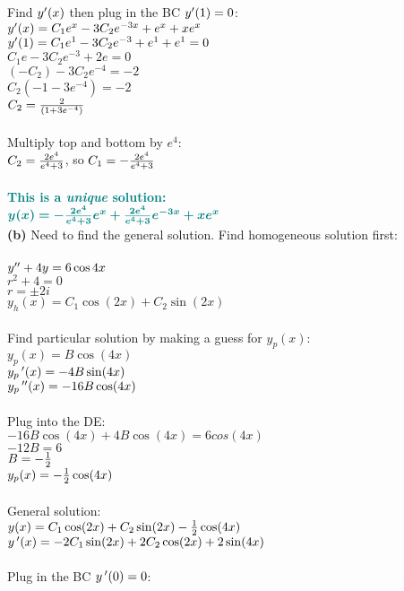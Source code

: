 \documentclass{article}
\begin{document}
\begin{enumerate}
Find $y\sp\prime(x)$ then plug in the BC $y\sp\prime(1)=0$:\\
$y\sp\prime(x) = C_1e^{x} - 3C_2e^{-3x} + e^x + xe^x$\\
$y\sp\prime(1) = C_1e^{1} - 3C_2e^{-3} + e^1 + e^1 = 0$\\
$C_1e - 3C_2e^{-3} + 2e = 0$\\
$(-C_2) - 3C_2e^{-4} = -2$\\
$C_2(-1 - 3e^{-4}) = -2$\\
$C_2 = {2 \over (1 + 3e^{-4})}$\\\\
Multiply top and bottom by $e^4$:\\
$C_2 = {2e^4 \over e^4 + 3}$, so $C_1 = -{2e^4 \over e^4 + 3}$\\\\
\textcolor{teal}{\textbf{This is a \emph{unique} solution:}}\\
$\textcolor{teal}{\bm{y(x) = -{2e^4 \over e^4 + 3}e^{x} + {2e^4 \over e^4 + 3}e^{-3x} + xe^x}}$\\
\newpage
\textbf{(b)} Need to find the general solution. Find homogeneous solution first:\\\\
$y\sp{\prime\prime}+4y=6\cos4x$\\
$r^2+4=0$\\
$r=\pm 2i$\\
$y_h(x) = C_1\cos(2x) + C_2\sin(2x)$\\\\
Find particular solution by making a guess for $y_p(x)$:\\
$y_p(x) = B\cos(4x)$\\
$y_p\,\sp{\prime}(x) = -4B\sin(4x)$\\
$y_p\,\sp{\prime\prime}(x) = -16B\cos(4x)$\\\\
Plug into the DE:\\
$-16B\cos(4x) + 4B\cos(4x)= 6cos(4x)$\\
$-12B = 6$\\
$B = -{1\over2}$\\
$y_p(x) = -{1\over2}\cos(4x)$\\\\
General solution:\\
$y(x) = C_1\cos(2x) + C_2\sin(2x) -{1\over2}\cos(4x)$\\
$y\,\sp\prime(x) = -2C_1\sin(2x) + 2C_2\cos(2x) + 2\sin(4x)$\\\\
Plug in the BC $y\,\sp\prime(0)=0$:\\

\end{enumerate}
\end{document}
